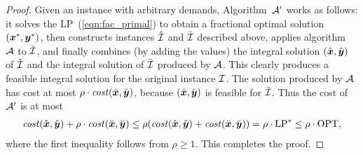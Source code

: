 \documentclass[11pt]{article}
\begin{document}

\begin{proof}
  Given an {\FTFP} instance with arbitrary demands, Algorithm~${\cal A}'$ works
as follows: it solves the LP~(\ref{eqn:fac_primal}) to obtain a
  fractional optimal solution $(\boldsymbol{x}^\ast,\boldsymbol{y}^\ast)$, then constructs
  instances ${\hat{\cal I}}$ and ${\bar{\cal I}}$ described above,  applies
  algorithm~${\cal A}$ to ${\bar{\cal I}}$, and finally combines (by adding
  the values) the integral solution $(\hat{\boldsymbol{x}}, \hat{\boldsymbol{y}})$ of
  ${\hat{\cal I}}$ and the integral solution of ${\bar{\cal I}}$ produced
  by ${\cal A}$. This clearly produces a feasible integral
  solution for the original instance $\mathcal{I}$.
The solution produced by ${\cal A}$ has cost at most
$\rho\cdot{\it cost}(\bar{\boldsymbol{x}},\bar{\boldsymbol{y}})$, because $(\bar{\boldsymbol{x}},\bar{\boldsymbol{y}})$
is feasible for ${\bar{\cal I}}$. Thus the cost of ${\cal A}'$ is at most
% 
 \begin{align*}
 {\it cost}(\hat{\boldsymbol{x}}, \hat{\boldsymbol{y}}) + \rho\cdot{\it cost}(\bar{\boldsymbol{x}},\bar{\boldsymbol{y}})
	\le
 \rho({\it cost}(\hat{\boldsymbol{x}}, \hat{\boldsymbol{y}}) + {\it cost}(\bar{\boldsymbol{x}},\bar{\boldsymbol{y}}))
		= \rho\cdot\mbox{\rm LP}^\ast \le \rho\cdot\mbox{\rm OPT},
  \end{align*}
%
where the first inequality follows from $\rho\geq 1$. This completes
the proof.
\end{proof}

\end{document}
